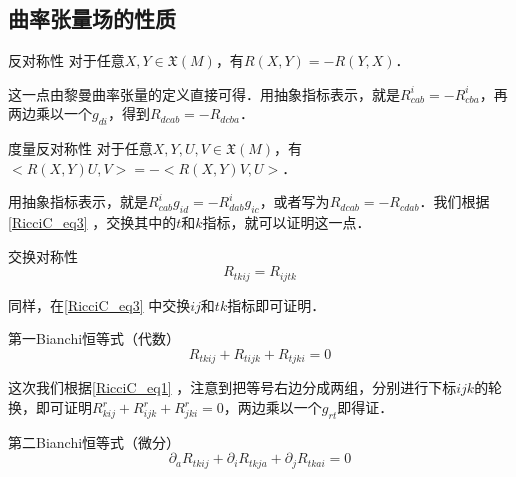 








\subsection{曲率张量场的性质}

\begin{theorem}{反对称性}
对于任意$X, Y\in\mathfrak{X}(M)$，有$R(X, Y)=-R(Y, X)$．
\end{theorem}


这一点由黎曼曲率张量的定义直接可得．用抽象指标表示，就是$R^i_{cab}=-R^i_{cba}$，再两边乘以一个$g_{di}$，得到$R_{dcab}=-R_{dcba}$．





\begin{theorem}{度量反对称性}
对于任意$X, Y, U, V\in\mathfrak{X}(M)$，有$<R(X, Y)U, V>=-<R(X, Y)V, U>$．


\end{theorem}

用抽象指标表示，就是$R^i_{cab}g_{id}=-R^i_{dab}g_{ic}$，或者写为$R_{dcab}=-R_{cdab}$．我们根据\autoref{RicciC_eq3}  ，交换其中的$t$和$k$指标，就可以证明这一点．

\begin{theorem}{交换对称性}
\begin{equation}\label{RicciC_eq5}
R_{tkij}=R_{ijtk}
\end{equation}
\end{theorem}

同样，在\autoref{RicciC_eq3} 中交换$ij$和$tk$指标即可证明．

\begin{theorem}{第一Bianchi恒等式（代数）}
\begin{equation}\label{RicciC_eq4}
R_{tkij}+R_{tijk}+R_{tjki}=0
\end{equation}
\end{theorem}

这次我们根据\autoref{RicciC_eq1} ，注意到把等号右边分成两组，分别进行下标$ijk$的轮换，即可证明$R^r_{kij}+R^r_{ijk}+R^r_{jki}=0$，两边乘以一个$g_{rt}$即得证．

\begin{theorem}{第二Bianchi恒等式（微分）}
\begin{equation}\label{RicciC_eq7}
\partial_aR_{tkij}+\partial_iR_{tkja}+\partial_jR_{tkai}=0
\end{equation}
\end{theorem}

